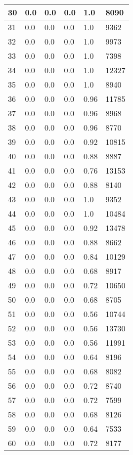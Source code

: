 \begin{longtable}{|l|l|l|l|l|l|}
30 & 0.0 & 0.0 & 0.0 & 1.0 & 8090 \\ \hline 
31 & 0.0 & 0.0 & 0.0 & 1.0 & 9362 \\ \hline 
32 & 0.0 & 0.0 & 0.0 & 1.0 & 9973 \\ \hline 
33 & 0.0 & 0.0 & 0.0 & 1.0 & 7398 \\ \hline 
34 & 0.0 & 0.0 & 0.0 & 1.0 & 12327 \\ \hline 
35 & 0.0 & 0.0 & 0.0 & 1.0 & 8940 \\ \hline 
36 & 0.0 & 0.0 & 0.0 & 0.96 & 11785 \\ \hline 
37 & 0.0 & 0.0 & 0.0 & 0.96 & 8968 \\ \hline 
38 & 0.0 & 0.0 & 0.0 & 0.96 & 8770 \\ \hline 
39 & 0.0 & 0.0 & 0.0 & 0.92 & 10815 \\ \hline 
40 & 0.0 & 0.0 & 0.0 & 0.88 & 8887 \\ \hline 
41 & 0.0 & 0.0 & 0.0 & 0.76 & 13153 \\ \hline 
42 & 0.0 & 0.0 & 0.0 & 0.88 & 8140 \\ \hline 
43 & 0.0 & 0.0 & 0.0 & 1.0 & 9352 \\ \hline 
44 & 0.0 & 0.0 & 0.0 & 1.0 & 10484 \\ \hline 
45 & 0.0 & 0.0 & 0.0 & 0.92 & 13478 \\ \hline 
46 & 0.0 & 0.0 & 0.0 & 0.88 & 8662 \\ \hline 
47 & 0.0 & 0.0 & 0.0 & 0.84 & 10129 \\ \hline 
48 & 0.0 & 0.0 & 0.0 & 0.68 & 8917 \\ \hline 
49 & 0.0 & 0.0 & 0.0 & 0.72 & 10650 \\ \hline 
50 & 0.0 & 0.0 & 0.0 & 0.68 & 8705 \\ \hline 
51 & 0.0 & 0.0 & 0.0 & 0.56 & 10744 \\ \hline 
52 & 0.0 & 0.0 & 0.0 & 0.56 & 13730 \\ \hline 
53 & 0.0 & 0.0 & 0.0 & 0.56 & 11991 \\ \hline 
54 & 0.0 & 0.0 & 0.0 & 0.64 & 8196 \\ \hline 
55 & 0.0 & 0.0 & 0.0 & 0.68 & 8082 \\ \hline 
56 & 0.0 & 0.0 & 0.0 & 0.72 & 8740 \\ \hline 
57 & 0.0 & 0.0 & 0.0 & 0.72 & 7599 \\ \hline 
58 & 0.0 & 0.0 & 0.0 & 0.68 & 8126 \\ \hline 
59 & 0.0 & 0.0 & 0.0 & 0.64 & 7533 \\ \hline 
60 & 0.0 & 0.0 & 0.0 & 0.72 & 8177 \\ \hline 

\end{longtable}

